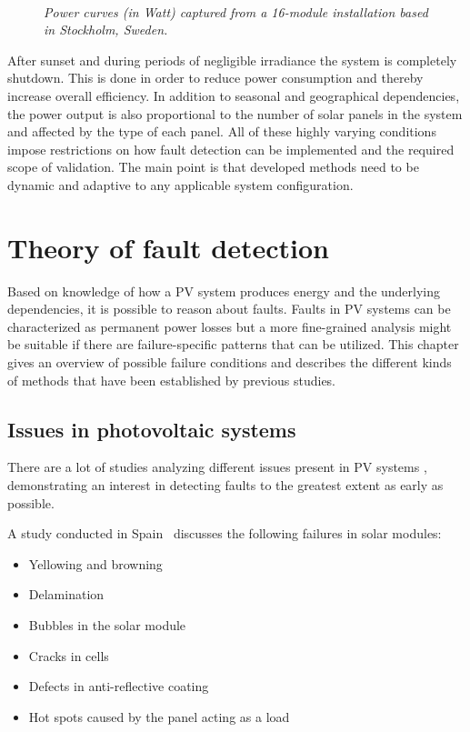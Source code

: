 \begin{figure}[here]
\centering
{}
~
\caption[Power curves captured from an installation]{\emph{Power curves (in Watt) captured from a 16-module installation based in Stockholm, Sweden.}}
\end{figure}

After sunset and during periods of negligible irradiance the system is completely shutdown.
This is done in order to reduce power consumption and thereby increase overall efficiency.
In addition to seasonal and geographical dependencies, the power output is also proportional to the number of solar panels in the system and affected by the type of each panel.
All of these highly varying conditions impose restrictions on how fault detection can be implemented and the required scope of validation.
The main point is that developed methods need to be dynamic and adaptive to any applicable system configuration.

\chapter{Theory of fault detection}
Based on knowledge of how a PV system produces energy and the underlying dependencies,
it is possible to reason about faults.
Faults in PV systems can be characterized as permanent power losses but a more fine-grained analysis might be suitable if there are failure-specific patterns that can be utilized.
This chapter gives an overview of possible failure conditions and describes the different kinds of methods that have been established by previous studies.

\section{Issues in photovoltaic systems}
There are a lot of studies analyzing different issues present in PV systems \cite{Baltus1997,King2002,Petrone2008}, demonstrating an interest in detecting faults to the greatest extent as early as possible.

A study conducted in Spain~\cite{Munoz2011} discusses the following failures in solar modules:
\begin{itemize}
\item Yellowing and browning
\item Delamination
\item Bubbles in the solar module
\item Cracks in cells
\item Defects in anti-reflective coating
\item Hot spots caused by the panel acting as a load
\end{itemize}

